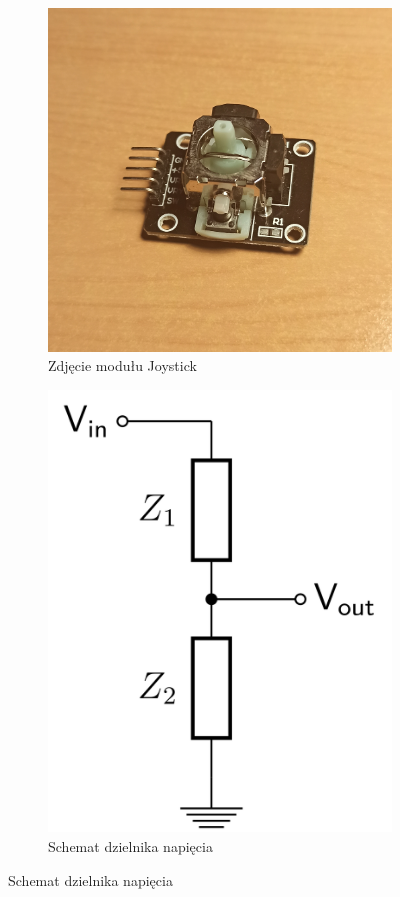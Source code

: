 \documentclass[11pt, a4paper]{article}
\begin{document}
\begin{figure}[h]
\centering
\begin{subfigure}{.5\textwidth}
\centering
\includegraphics[width=.6\linewidth]{fig/Joystick/joystick_photo.jpg}
\caption{Zdjęcie modułu Joystick}
\label{fig:_zdjecie_modulu}
\end{subfigure}%
\begin{subfigure}{.5\textwidth}
\centering
\includegraphics[width=.5\linewidth]{fig/Joystick/voltage_divider_schematic.png}
\caption{Schemat dzielnika napięcia}
\label{fig:_schemat_modulu}
\end{subfigure}
\label{fig:modul}
\end{figure}
\vspace{0.5cm}
\end{document}
